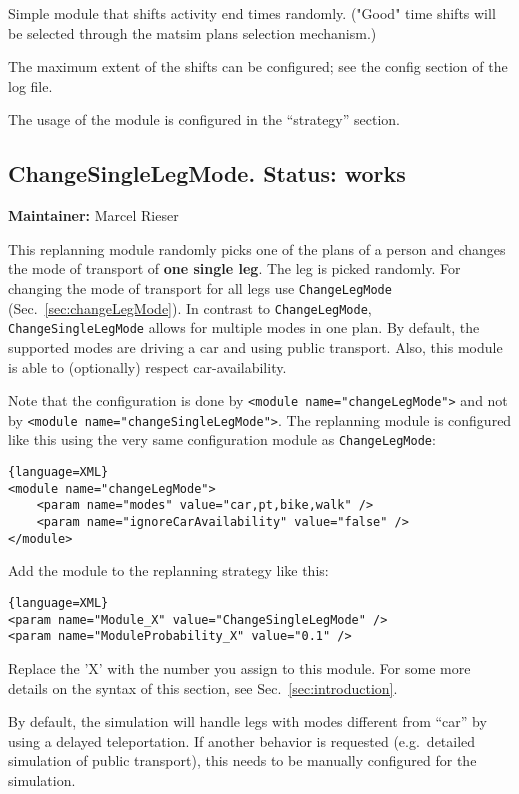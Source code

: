 Simple  module that shifts activity end times randomly. ("Good" time  shifts will be selected through the matsim plans selection mechanism.)

The maximum extent of the shifts can be configured; see the config  section of the log file. 

The usage of the module is configured in the ``strategy'' section.

\subsection{ChangeSingleLegMode. Status: works}

\textbf{Maintainer:} Marcel Rieser

This replanning module randomly picks one of the plans of a person and changes the mode of transport of \textbf{one single leg}. The leg is picked randomly. For changing the mode of transport for all legs use \verb$ChangeLegMode$ (Sec.~\ref{sec:changeLegMode}). In contrast to \verb$ChangeLegMode$,  \verb$ChangeSingleLegMode$ allows for multiple modes in one plan. By default,  the supported modes are driving a car and using public transport. Also,  this module is able to (optionally) respect car-availability.

Note that the configuration is done by \verb$<module name="changeLegMode">$ and not by \verb$<module name="changeSingleLegMode">$. The replanning module is configured like  this using the very same configuration module as \verb$ChangeLegMode$:
\begin{lstlisting}{language=XML}
<module name="changeLegMode">
    <param name="modes" value="car,pt,bike,walk" />
    <param name="ignoreCarAvailability" value="false" />
</module>
\end{lstlisting}

Add the module to the replanning strategy like this:
\begin{lstlisting}{language=XML}
<param name="Module_X" value="ChangeSingleLegMode" />
<param name="ModuleProbability_X" value="0.1" />
\end{lstlisting}

Replace the 'X' with the number you assign to this module. For some more details on the syntax of this section, see Sec.~\ref{sec:introduction}.

By default, the simulation will handle legs with modes different from  ``car'' by using a delayed teleportation. If another behavior is  requested (e.g.\ detailed simulation of public transport), this needs to  be manually configured for the simulation.


